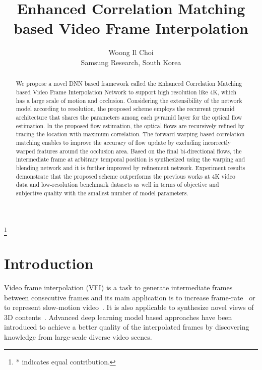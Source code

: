 \documentclass[10pt,twocolumn,letterpaper]{article}
\newcommand\blfootnote[1]{\begingroup
  \renewcommand\thefootnote{}\footnote{#1}\addtocounter{footnote}{-1}\endgroup
}
\begin{document}
\title{Enhanced Correlation Matching based Video Frame Interpolation}

\author{
\qquad

\qquad
Woong Il Choi\\
Samsung Research, South Korea\\
}

\maketitle
\ifwacvfinal
\thispagestyle{empty}
\fi
\begin{abstract}
We propose a novel DNN based framework called the Enhanced Correlation Matching based Video Frame Interpolation Network to support high resolution like 4K, which has a large scale of motion and occlusion. 
Considering the extensibility of the network model according to resolution, the proposed scheme employs the recurrent pyramid architecture that shares the parameters among each pyramid layer for the optical flow estimation. 
In the proposed flow estimation, the optical flows are recursively refined by tracing the location with maximum correlation. 
The forward warping based correlation matching enables to improve the accuracy of flow update by excluding incorrectly warped features around the occlusion area.
Based on the final bi-directional flows, the intermediate frame at arbitrary temporal position is synthesized using the warping and blending network and it is further improved by refinement network.
Experiment results demonstrate that the proposed scheme outperforms the previous works at 4K video data and low-resolution benchmark datasets as well in terms of objective and subjective quality with the smallest number of model parameters.
\end{abstract}
\blfootnote{* indicates equal contribution.}
\section{Introduction}

Video frame interpolation (VFI) is a task to generate intermediate frames between consecutive frames and its main application is to increase frame-rate~\cite{meyer2015phase} or to represent slow-motion video~\cite{jiang2018super}.
It is also applicable to synthesize novel views of 3D contents~\cite{flynn2016deepstereo}. Advanced deep learning model based approaches have been introduced to achieve a better quality of the interpolated frames by discovering knowledge from large-scale diverse video scenes.
\end{document}
